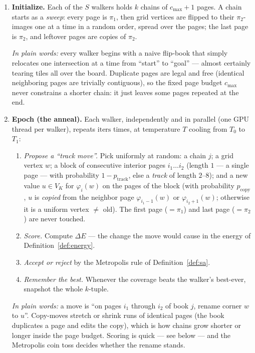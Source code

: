 \documentclass[11pt]{article}
\theoremstyle{definition}
\begin{document}
\begin{enumerate}[leftmargin=1.8em, itemsep=3pt]
  \item \textbf{Initialize.} Each of the $S$ walkers holds $k$ chains of
  $c_{\max} + 1$ pages. A chain starts as a \emph{sweep}: every page is
  $\pi_1$, then grid vertices are flipped to their $\pi_2$-images one at a
  time in a random order, spread over the pages; the last page is $\pi_2$,
  and leftover pages are copies of $\pi_2$.

  \emph{In plain words:} every walker begins with a naive flip-book that
  simply relocates one intersection at a time from ``start'' to ``goal'' ---
  almost certainly tearing tiles all over the board. Duplicate pages are
  legal and free (identical neighboring pages are trivially contiguous), so
  the fixed page budget $c_{\max}$ never constrains a shorter chain: it
  just leaves some pages repeated at the end.

  \item \textbf{Epoch (the anneal).} Each walker, independently and in
  parallel (one GPU thread per walker), repeats $\mathrm{iters}$ times, at
  temperature $T$ cooling from $T_0$ to $T_1$:
  \begin{enumerate}[label=(\alph*), leftmargin=1.8em, itemsep=2pt]
    \item \emph{Propose a ``track move''.} Pick uniformly at random: a
    chain $j$; a grid vertex $w$; a block of consecutive interior pages
    $i_1 \dots i_2$ (length $1$ --- a single page --- with probability
    $1 - p_{\mathrm{track}}$, else a \emph{track} of length $2$--$8$); and a
    new value $u \in V_K$ for $\varphi_i(w)$ on the pages of the block (with
    probability $p_{\mathrm{copy}}$, $u$ is \emph{copied} from the neighbor
    page $\varphi_{i_1-1}(w)$ or $\varphi_{i_2+1}(w)$; otherwise it is a
    uniform vertex $\neq$ old). The first page ($= \pi_1$) and last page
    ($= \pi_2$) are never touched.
    \item \emph{Score.} Compute $\Delta E$ --- the change the move would
    cause in the energy of Definition~\ref{def:energy}.
    \item \emph{Accept or reject} by the Metropolis rule of
    Definition~\ref{def:sa}.
    \item \emph{Remember the best.} Whenever the coverage beats the walker's
    best-ever, snapshot the whole $k$-tuple.
  \end{enumerate}

  \emph{In plain words:} a move is ``on pages $i_1$ through $i_2$ of book
  $j$, rename corner $w$ to $u$''. Copy-moves stretch or shrink runs of
  identical pages (the book duplicates a page and edits the copy), which is
  how chains grow shorter or longer inside the page budget. Scoring is quick
  --- see below --- and the Metropolis coin toss decides whether the rename
  stands.


\end{enumerate}
\end{document}
